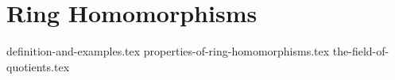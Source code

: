 \chapter{Ring Homomorphisms}
{definition-and-examples.tex}
{properties-of-ring-homomorphisms.tex}
{the-field-of-quotients.tex}
